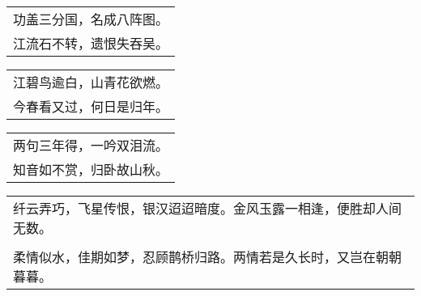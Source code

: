 \nopagebreak%
\nopagebreak%
\noindent\begin{minipage}{\linewidth}
  \vskip-3pt\begin{table}[H]
    \centering
    \begin{tabular}{@{}l@{}}
功盖三分国，名成八阵图。\\
江流石不转，遗恨失吞吴。
    \end{tabular}
  \end{table}
\end{minipage}
\vspace{1cm}


\nopagebreak%
\nopagebreak%
\noindent\begin{minipage}{\linewidth}
  \vskip-3pt\begin{table}[H]
    \centering
    \begin{tabular}{@{}l@{}}
江碧鸟逾白，山青花欲燃。\\
今春看又过，何日是归年。
    \end{tabular}
  \end{table}
\end{minipage}
\vspace{1cm}


\nopagebreak%
\nopagebreak%
\noindent\begin{minipage}{\linewidth}
  \vskip-3pt\begin{table}[H]
    \centering
    \begin{tabular}{@{}l@{}}
两句三年得，一吟双泪流。\\
知音如不赏，归卧故山秋。
    \end{tabular}
  \end{table}
\end{minipage}
\vspace{1cm}


\nopagebreak%
\nopagebreak%
\noindent\begin{minipage}{\linewidth}
  \vskip-3pt\begin{table}[H]
    \centering
    \begin{tabular}{@{}l@{}}
纤云弄巧，飞星传恨，银汉迢迢暗度。金风玉露一相逢，便胜却人间无数。\\
\\
柔情似水，佳期如梦，忍顾鹊桥归路。两情若是久长时，又岂在朝朝暮暮。
    \end{tabular}
  \end{table}
\end{minipage}
\vspace{1cm}


